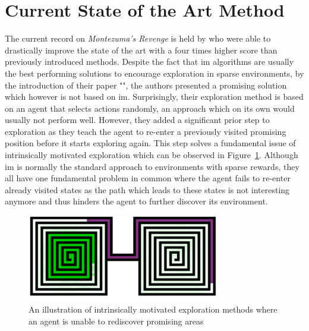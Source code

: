 \documentclass[draft,final]{vutinfth} %
\begin{document}
    \section{Current State of the Art Method}

    The current record on \textit{Montezuma's Revenge} is held by \citeauthor{ecoffet_go-explore_2019} who were able to drastically improve the state of the art with a four times higher score than previously introduced methods.
    Despite the fact that \gls{im} algorithms are usually the best performing solutions to encourage exploration in sparse environments, by the introduction of their paper "", the authors presented a promising solution which however is not based on \gls{im}.
    Surprisingly, their exploration method is based on an agent that selects actions randomly, an approach which on its own would usually not perform well.
    However, they added a significant prior step to exploration as they teach the agent to re-enter a previously visited promising position before it starts exploring again.
    This step solves a fundamental issue of intrinsically motivated exploration which can be observed in Figure~\ref{fig:exploration_problem}.
    Although \gls{im} is normally the standard approach to environments with sparse rewards, they all have one fundamental problem in common where the agent fails to re-enter already visited states as the path which leads to these states is not interesting anymore and thus hinders the agent to further discover its environment.

    \begin{figure}[h]
        \centering
        \includegraphics[width=0.75\textwidth]{figures/exploration_problem.png}
        \caption[An illustration of intrinsically motivated exploration methods where an agent is unable to rediscover promising areas]{An illustration of intrinsically motivated exploration methods where an agent is unable to rediscover promising areas\protect\footnotemark}
        \label{fig:exploration_problem}
    \end{figure}
\end{document}
